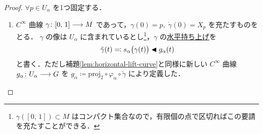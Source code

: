 \documentclass[TQFT_main]{subfiles}
\begin{document}
\begin{proof}
    $\forall p \in U_\alpha$ を1つ固定する．
    \begin{enumerate}
        \item 
        $C^\infty$ 曲線 $\gamma \colon [0,\, 1] \longrightarrow M$ であって，$\gamma(0) = p,\; \dot{\gamma}(0) = X_p$ を充たすものをとる．
        $\gamma$ の像は $U_\alpha$ に含まれているとし\footnote{$\gamma([0,\, 1]) \subset M$ はコンパクト集合なので，有限個の点で区切ればこの要請を充たすことができる．}，$\gamma$ の\hyperref[def:horizontal-lift-curve]{水平持ち上げ}を
        \begin{align}
            \tilde{\gamma}(t) \eqqcolon s_\alpha \bigl( \gamma(t) \bigr) \blacktriangleleft g_\alpha(t)
        \end{align}
        と書く．ただし補題\ref{lem:horizontal-lift-curve}と同様に新しい $C^\infty$ 曲線 $g_\alpha \colon U_\alpha \longrightarrow G$ を $g_\alpha \coloneqq \mathrm{proj}_2 \circ \varphi_\alpha \circ \tilde{\gamma}$ により定義した．
    

\end{enumerate}
\end{proof}
\end{document}
